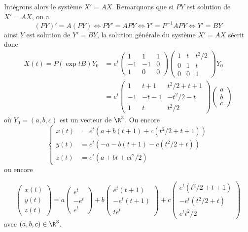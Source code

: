 {\begin{enumerate}
{Int\'egrons alors le syst\`eme $X'=AX$. Remarquons que si $PY$ est solution de $X'=AX$, on a 
$$(PY)'=A(PY)\iff PY'=APY\iff Y'=P^{-1}APY\iff Y'=BY$$
ainsi $Y$ est solution de $Y'=BY$, la solution g\'en\'erale du syst\`eme $X'=AX$ s\'ecrit donc
$$\begin{align*}X(t)=P(\exp tB)Y_0&=e^t\begin{pmatrix}1& 1 &1 \\  -1&-1&0 \\ 1&0&0\end{pmatrix}\begin{pmatrix}1&t&t^2/2 \\ 0&1&t \\ 0&0&1\end{pmatrix}Y_0 \\  &=e^t
\begin{pmatrix}1& t+1& t^2/2+t+1 \\  -1&-t-1&-t^2/2-t \\  1&t&t^2/2\end{pmatrix}\begin{pmatrix}a \\  b \\  c\end{pmatrix}\end{align*}$$
o\`u $Y_0=(a,b,c)$ est un vecteur de $\R^3$. Ou encore
$$\left\{\begin{align*}
x(t)&=e^t(a+b(t+1)+c(t^2/2+t+1)) \\  y(t)&=e^t(-a-b(t+1)-c(t^2/2+t)) \\  z(t)&=e^t(a+bt+ct^2/2)
\end{align*}\right.$$ ou encore

$$\begin{pmatrix}x(t) \\  y(t) \\  z(t)\end{pmatrix}=a\begin{pmatrix}e^t \\  -e^t \\  e^t\end{pmatrix}+
b\begin{pmatrix}e^t(t+1) \\  -e^t(t+1) \\  te^t\end{pmatrix}+c\begin{pmatrix}e^t(t^2/2+t+1) \\  -e^t(t^2/2+t) \\  e^t t^2/2\end{pmatrix}$$
avec $(a,b,c)\in\R^3$.}
\end{enumerate}
}
